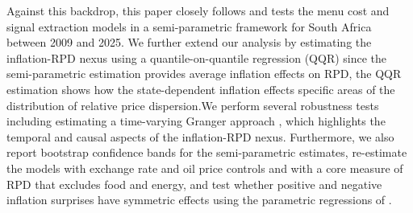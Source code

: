 \documentclass[
  letterpaper,
  DIV=11,
  numbers=noendperiod]{scrartcl}
\begin{document}
Against this backdrop, this paper closely follows \citet{caraballo2013}
and tests the menu cost and signal extraction models in a
semi-parametric framework \citep{robinson1988a} for South Africa between
2009 and 2025. We further extend our analysis by estimating the
inflation-RPD nexus using a quantile-on-quantile regression (QQR) since
the semi-parametric estimation provides average inflation effects on
RPD, the QQR estimation shows how the state-dependent inflation effects
specific areas of the distribution of relative price dispersion.We
perform several robustness tests including estimating a time-varying
Granger approach \citep{lu2014}, which highlights the temporal and
causal aspects of the inflation-RPD nexus. Furthermore, we also report
bootstrap confidence bands for the semi-parametric estimates,
re-estimate the models with exchange rate and oil price controls and
with a core measure of RPD that excludes food and energy, and test
whether positive and negative inflation surprises have symmetric effects
using the parametric regressions of \citet{caraballo2013}.
\end{document}
